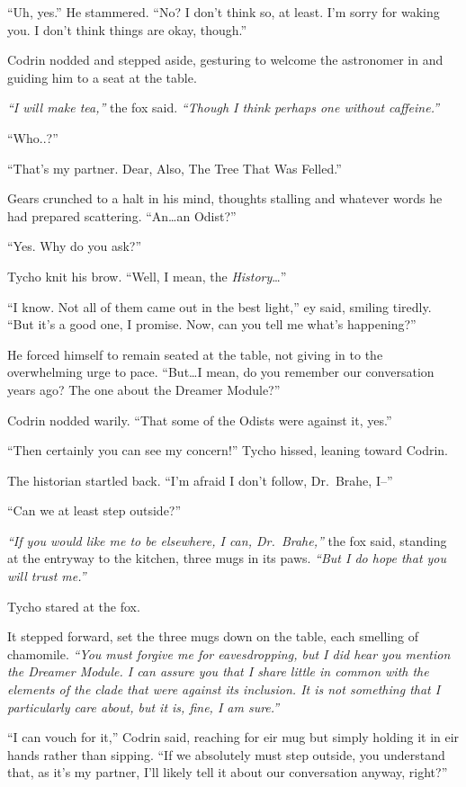 ``Uh, yes.'' He stammered. ``No? I don't think so, at least. I'm sorry for waking you. I don't think things are okay, though.''

Codrin nodded and stepped aside, gesturing to welcome the astronomer in and guiding him to a seat at the table.

\emph{``I will make tea,''} the fox said. \emph{``Though I think perhaps one without caffeine.''}

``Who..?''

``That's my partner. Dear, Also, The Tree That Was Felled.''

Gears crunched to a halt in his mind, thoughts stalling and whatever words he had prepared scattering. ``An\ldots an Odist?''

``Yes. Why do you ask?''

Tycho knit his brow. ``Well, I mean, the \emph{History}\ldots{}''

``I know. Not all of them came out in the best light,'' ey said, smiling tiredly. ``But it's a good one, I promise. Now, can you tell me what's happening?''

He forced himself to remain seated at the table, not giving in to the overwhelming urge to pace. ``But\ldots I mean, do you remember our conversation years ago? The one about the Dreamer Module?''

Codrin nodded warily. ``That some of the Odists were against it, yes.''

``Then certainly you can see my concern!'' Tycho hissed, leaning toward Codrin.

The historian startled back. ``I'm afraid I don't follow, Dr.~Brahe, I--''

``Can we at least step outside?''

\emph{``If you would like me to be elsewhere, I can, Dr.~Brahe,''} the fox said, standing at the entryway to the kitchen, three mugs in its paws. \emph{``But I do hope that you will trust me.''}

Tycho stared at the fox.

It stepped forward, set the three mugs down on the table, each smelling of chamomile. \emph{``You must forgive me for eavesdropping, but I did hear you mention the Dreamer Module. I can assure you that I share little in common with the elements of the clade that were against its inclusion. It is not something that I particularly care about, but it is, fine, I am sure.''}

``I can vouch for it,'' Codrin said, reaching for eir mug but simply holding it in eir hands rather than sipping. ``If we absolutely must step outside, you understand that, as it's my partner, I'll likely tell it about our conversation anyway, right?''

